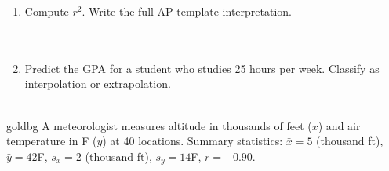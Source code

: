 \documentclass[10pt]{article}
\begin{document}
\begin{enumerate}[leftmargin=1.6em, itemsep=0.18in]
  \item Compute $r^2$. Write the full AP-template interpretation.\\[8pt]
        \\[3pt]
        \\[3pt]

  \item Predict the GPA for a student who studies 25 hours per week. Classify as interpolation
        or extrapolation.\\[8pt]
        \\[3pt]

\end{enumerate}

\vspace{0.18in}

\begin{scenariobox}{goldbg}
\small A meteorologist measures altitude in thousands of feet ($x$) and air temperature in
\textdegree F ($y$) at 40 locations. Summary statistics: $\bar{x} = 5$ (thousand ft),
$\bar{y} = 42$\textdegree F, $s_x = 2$ (thousand ft), $s_y = 14$\textdegree F, $r = -0.90$.
\end{scenariobox}

\vspace{0.1in}
\end{document}
